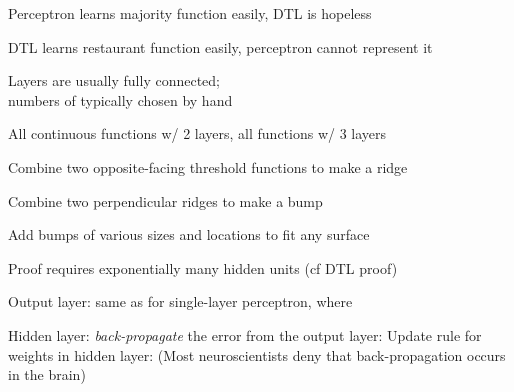 \documentclass{article}
\begin{document}
\begin{huge}
\vspace*{0.5in}


Perceptron learns majority function easily, DTL is hopeless


DTL learns restaurant function easily, perceptron cannot represent it


Layers are usually fully connected;\\
numbers of  typically chosen by hand

\vspace*{0.2in}

\textwidth
{}


All continuous functions w/ 2 layers, all functions w/ 3 layers

\vspace*{0.2in}


Combine two opposite-facing threshold functions to make a ridge

Combine two perpendicular ridges to make a bump

Add bumps of various sizes and locations to fit any surface

Proof requires exponentially many hidden units (cf DTL proof)




Output layer: same as for single-layer perceptron,
where 

Hidden layer: \emph{back-propagate} the error from the output layer:
\mat{\[
   \Delta_j = g'(\J{in}{}_j) \sum_i \w{j}{i} \Delta_i\ .
\]}
Update rule for weights in hidden layer:
(Most neuroscientists deny that back-propagation occurs in the brain)


\end{huge}
\end{document}

